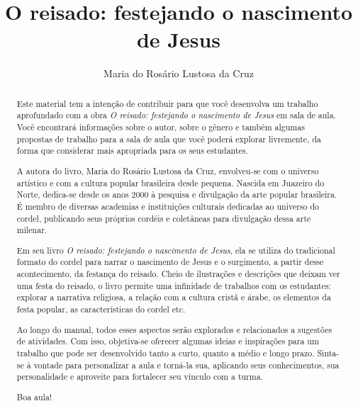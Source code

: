 \documentclass[11pt]{extarticle}
\newcommand{\AutorLivro}{Maria do Rosário Lustosa da Cruz}
\newcommand{\TituloLivro}{O reisado: festejando o nascimento de Jesus}
\newcommand{\colaborador}{Paulo Pompermaier}
\begin{document}
\title{\TituloLivro}
\author{\AutorLivro}
\def\authornotes{\colaborador}

\date{}
\maketitle

\tableofcontents


\begin{abstract}

Este material tem a intenção de contribuir para que você desenvolva um trabalho aprofundado com a obra \textit{O reisado: festejando o nascimento de Jesus} em sala de aula.
Você encontrará informações sobre o autor, sobre o gênero e também 
algumas propostas de trabalho para a sala de aula que você poderá explorar livremente, 
da forma que considerar mais apropriada para os seus estudantes.

A autora do livro, Maria do Rosário Lustosa da Cruz, envolveu-se com o universo artístico e com a cultura popular brasileira desde pequena. Nascida em Juazeiro do Norte, dedica-se desde os anos 2000 à pesquisa e divulgação da arte popular brasileira. É membro de diversas academias e instituições culturais dedicadas ao universo do cordel, publicando seus próprios cordéis e coletâneas para divulgação dessa arte milenar.

Em seu livro \textit{O reisado: festejando o nascimento de Jesus}, ela se utiliza do tradicional formato do cordel para narrar o nascimento de Jesus e o surgimento, a partir desse acontecimento, da festança do reisado. Cheio de ilustrações e descrições que deixam ver uma festa do reisado, o livro permite uma infinidade de trabalhos com os estudantes: explorar a narrativa religiosa, a relação com a cultura cristã e árabe, os elementos da festa popular, as características do cordel etc. 


Ao longo do manual, todos esses aspectos serão explorados e relacionados a sugestões de atividades. Com isso, objetiva-se oferecer algumas ideias e inspirações para um trabalho que pode ser desenvolvido tanto a curto, quanto a médio e longo prazo. Sinta-se à vontade para personalizar a aula e torná-la sua, aplicando seus conhecimentos, sua 
personalidade e aproveite para fortalecer seu vínculo com a turma.

Boa aula!

\end{abstract}
\end{document}
